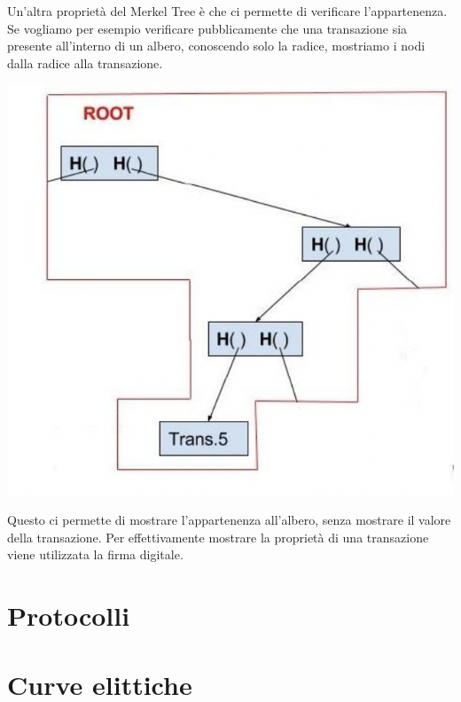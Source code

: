 \documentclass[11pt, oneside]{article}   	%
\begin{document}
Un'altra proprietà del Merkel Tree è che ci permette di verificare l'appartenenza. Se vogliamo per esempio verificare pubblicamente che una transazione sia presente all'interno di un albero, conoscendo solo la radice, mostriamo i nodi dalla radice alla transazione.
\begin{center}
\includegraphics[scale= 0.3]{5k}
\end{center}
Questo ci permette di mostrare l'appartenenza all'albero, senza mostrare il valore della transazione.
Per effettivamente mostrare la proprietà di una transazione viene utilizzata la firma digitale.

\section*{Protocolli}

\section*{Curve elittiche}
\end{document}
